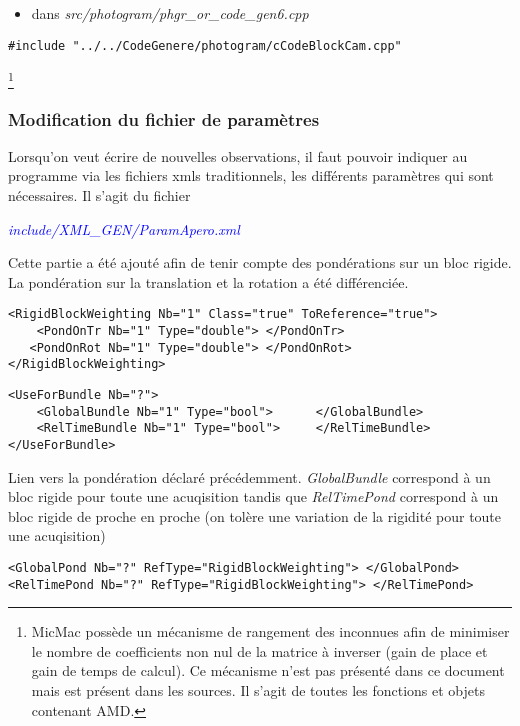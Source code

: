 \documentclass{article}
\newcommand\file[1]{
\textit{\textcolor{blue}{#1}}
}
\begin{document}
\begin{itemize}
\item dans \emph{src/photogram/phgr\_or\_code\_gen6.cpp}
\end{itemize}
\begin{verbatim}
#include "../../CodeGenere/photogram/cCodeBlockCam.cpp"
\end{verbatim}


\footnote{MicMac possède un mécanisme de rangement des inconnues afin de minimiser le nombre de coefficients non nul de la matrice à inverser (gain de place et gain de temps de calcul). Ce mécanisme n'est pas présenté dans ce document mais est présent dans les sources. Il s'agit de toutes les fonctions et objets contenant AMD.}



\subsubsection{Modification du fichier de paramètres}
Lorsqu'on veut écrire de nouvelles observations, il faut pouvoir indiquer au programme via les fichiers xmls traditionnels, les différents paramètres qui sont nécessaires.
Il s'agit du fichier 
\file{include/XML\_GEN/ParamApero.xml}

Cette partie a été ajouté afin de tenir compte des pondérations sur un bloc rigide.
La pondération sur la translation et la rotation a été différenciée.

\begin{verbatim}
<RigidBlockWeighting Nb="1" Class="true" ToReference="true">
    <PondOnTr Nb="1" Type="double"> </PondOnTr>
   <PondOnRot Nb="1" Type="double"> </PondOnRot>
</RigidBlockWeighting>
\end{verbatim}

\begin{verbatim}
<UseForBundle Nb="?">
    <GlobalBundle Nb="1" Type="bool">      </GlobalBundle>
    <RelTimeBundle Nb="1" Type="bool">     </RelTimeBundle>
</UseForBundle>
\end{verbatim}

Lien vers la pondération déclaré précédemment.
\emph{GlobalBundle} correspond à un bloc rigide pour toute une acuqisition tandis que \emph{RelTimePond} correspond à un bloc rigide de proche en proche (on tolère une variation de la rigidité pour toute une acuqisition)


\begin{verbatim}
<GlobalPond Nb="?" RefType="RigidBlockWeighting"> </GlobalPond>
<RelTimePond Nb="?" RefType="RigidBlockWeighting"> </RelTimePond>
\end{verbatim}
\end{document}
